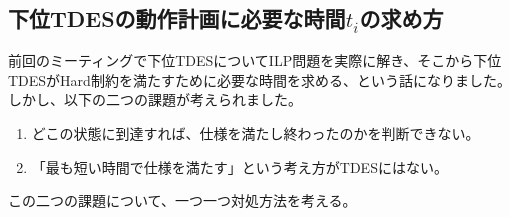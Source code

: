 \documentclass[ 10pt]{jsarticle}
\begin{document}
\subsection{下位TDESの動作計画に必要な時間$t_i$の求め方}\label{sec:time}
前回のミーティングで下位TDESについてILP問題を実際に解き、そこから下位TDESがHard制約を満たすために必要な時間を求める、という話になりました。
しかし、以下の二つの課題が考えられました。
\begin{enumerate}
\item
どこの状態に到達すれば、仕様を満たし終わったのかを判断できない。
\item
「最も短い時間で仕様を満たす」という考え方がTDESにはない。

\end{enumerate}
この二つの課題について、一つ一つ対処方法を考える。
\end{document}
